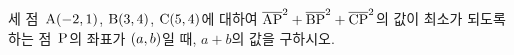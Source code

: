 세 점~$\mathrm{A}(-2{,}\mkern3mu\mathopen{}1)$, $\mathrm{B}(3{,}\mkern3mu\mathopen{}4)$, $\mathrm{C}(5{,}\mkern3mu\mathopen{}4)$에 대하여 $\overline{\mathrm{AP}}^2+\overline{\mathrm{BP}}^2+\overline{\mathrm{CP}}^2$의 값이 최소가 되도록 하는 점~$\mathrm{P}$의 좌표가 $(a{,}\mkern3mu\mathopen{}b)$일 때, $a+b$의 값을 구하시오.
